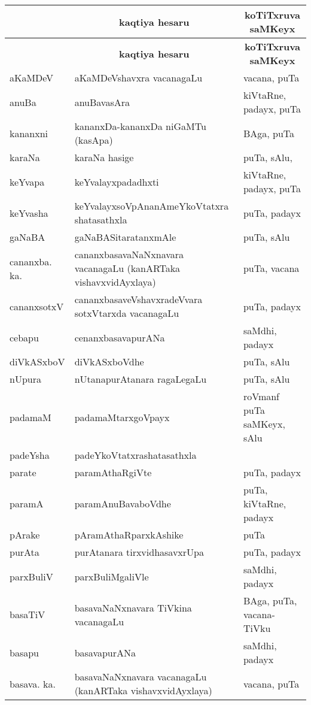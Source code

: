 {\renewcommand{\arraystretch}{1.3}
\begin{longtable}{>{\raggedright}p{3.5cm}ll}
\hline
\multicolumn{1}{c}{\bf saMkiSxpAtxkaSxra} & \multicolumn{1}{c}{\bf kaqtiya hesaru} & \multicolumn{1}{c}{\bf koTiTxruva saMKeyx}\\
\hline
\endfirsthead
\hline
\multicolumn{1}{c}{\bf saMkiSxpatx} & \multicolumn{1}{c}{\bf kaqtiya hesaru} & \multicolumn{1}{c}{\bf koTiTxruva saMKeyx}\\
\hline
\endhead
\hline
\endfoot
\endlastfoot
aKaMDeV & aKaMDeVshavxra vacanagaLu &  vacana, puTa\\
anuBa & anuBavasAra &  kiVtaRne, padayx, puTa\\
kananxni & kananxDa-kananxDa niGaMTu (kasApa) & BAga, puTa\\
karaNa & karaNa hasige & puTa, sAlu,\\
keYvapa & keYvalayxpadadhxti &  kiVtaRne, padayx, puTa\\
keYvasha & keYvalayxsoVpAnanAmeYkoVtatxra shatasathxla & puTa, padayx\\
gaNaBA & gaNaBASitaratanxmAle & puTa, sAlu\\
cananxba. ka. & cananxbasavaNaNxnavara vacanagaLu (kanARTaka vishavxvidAyxlaya) & puTa, vacana\\
cananxsotxV & cananxbasaveVshavxradeVvara sotxVtarxda vacanagaLu & puTa, padayx\\
cebapu & cenanxbasavapurANa & saMdhi, padayx\\
diVkASxboV & diVkASxboVdhe & puTa, sAlu\\
nUpura & nUtanapurAtanara ragaLegaLu & puTa, sAlu\\
padamaM & padamaMtarxgoVpayx & roVmanf puTa saMKeyx, sAlu\\
padeYsha & padeYkoVtatxrashatasathxla & \\
parate & paramAthaRgiVte & puTa, padayx\\
paramA & paramAnuBavaboVdhe & puTa, kiVtaRne, padayx\\
pArake & pAramAthaRparxkAshike & puTa\\
purAta & purAtanara tirxvidhasavxrUpa & puTa, padayx\\
parxBuliV & parxBuliMgaliVle & saMdhi, padayx\\
basaTiV & basavaNaNxnavara TiVkina vacanagaLu & BAga, puTa, vacana-TiVku\\
basapu & basavapurANa & saMdhi, padayx\\
basava. ka. & basavaNaNxnavara vacanagaLu (kanARTaka vishavxvidAyxlaya) & vacana, puTa\\

\end{longtable}}

